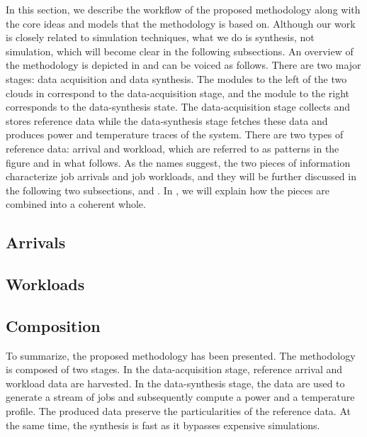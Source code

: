 In this section, we describe the workflow of the proposed methodology along with
the core ideas and models that the methodology is based on. Although our work is
closely related to simulation techniques, what we do is synthesis, not
simulation, which will become clear in the following subsections. An overview of
the methodology is depicted in  and can be voiced as follows.
There are two major stages: data acquisition and data synthesis. The modules to
the left of the two clouds in  correspond to the
data-acquisition stage, and the module to the right corresponds to the
data-synthesis state. The data-acquisition stage collects and stores reference
data while the data-synthesis stage fetches these data and produces power and
temperature traces of the system. There are two types of reference data: arrival
and workload, which are referred to as patterns in the figure and in what
follows. As the names suggest, the two pieces of information characterize job
arrivals and job workloads, and they will be further discussed in the following
two subsections,  and . In , we
will explain how the pieces are combined into a coherent whole.

\subsection{Arrivals} 


\subsection{Workloads} 


\subsection{Composition} 


To summarize, the proposed methodology has been presented. The methodology is
composed of two stages. In the data-acquisition stage, reference arrival and
workload data are harvested. In the data-synthesis stage, the data are used to
generate a stream of jobs and subsequently compute a power and a temperature
profile. The produced data preserve the particularities of the reference data.
At the same time, the synthesis is fast as it bypasses expensive simulations.
